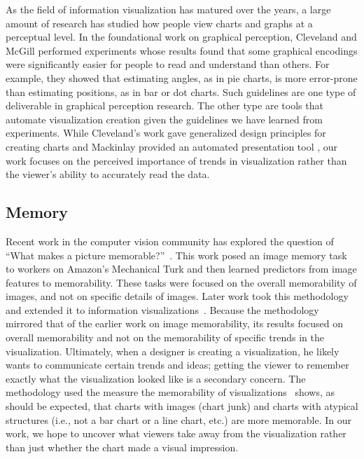 \documentclass{sigchi}
\begin{document}
As the field of information visualization has matured over the years,
a large amount of research has studied how people view charts and
graphs at a perceptual level. In the foundational work on graphical
perception, Cleveland and McGill \cite{Cleveland1985, Cleveland1984}
performed experiments whose results found that some graphical
encodings were significantly easier for people to read and understand
than others. For example, they showed that estimating angles, as in
pie charts, is more error-prone than estimating positions, as in bar
or dot charts. Such guidelines are one type of deliverable in
graphical perception research. The other type are tools that automate
visualization creation given the guidelines we have learned from
experiments. While Cleveland's work gave generalized design principles
for creating charts and Mackinlay provided an automated presentation
tool \cite{Mackinlay1987}, our work focuses on the perceived
importance of trends in visualization rather than the viewer's ability
to accurately read the data.

\subsection{Memory}

Recent work in the computer vision community has explored the question
of ``What makes a picture memorable?''~\cite{isola2011makes}. This
work posed an image memory task to workers on Amazon's Mechanical Turk
and then learned predictors from image features to memorability. These
tasks were focused on the overall memorability of images, and not on
specific details of images. Later work took this methodology and
extended it to information visualizations~\cite{borkin2013makes}.
Because the methodology mirrored that of the earlier work on image
memorability, its results focused on overall memorability and not on
the memorability of specific trends in the visualization. Ultimately,
when a designer is creating a visualization, he likely wants to
communicate certain trends and ideas; getting the viewer to remember
exactly what the visualization looked like is a secondary concern. The
methodology used the measure the memorability of
visualizations~\cite{borkin2013makes} shows, as should be expected,
that charts with images (chart junk) and charts with atypical
structures (i.e., not a bar chart or a line chart, etc.) are more
memorable. In our work, we hope to uncover what viewers take away from
the visualization rather than just whether the chart made a visual
impression.
\end{document}
